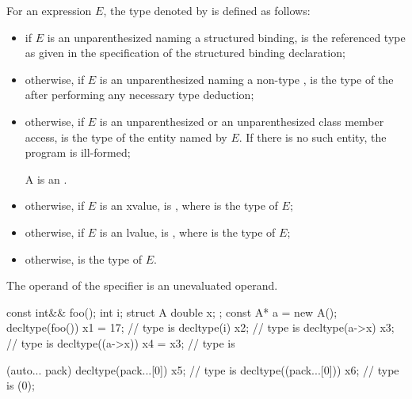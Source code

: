 \documentclass{wg21}
\begin{document}
\pnum
{}%
For an expression $E$, the type denoted by  is defined as follows:
\begin{itemize}
\item if $E$ is an unparenthesized 
naming a structured binding,
 is the referenced type as given in
the specification of the structured binding declaration;

\item otherwise, if $E$ is an unparenthesized 
naming a non-type ,
 is the type of the 
after performing any necessary
type deduction;

\item otherwise, if $E$ is an unparenthesized  or
an unparenthesized
class
member access,  is the
type of the entity named by $E$.
If there is no such entity, the program is ill-formed;

\begin{addedblock}
\begin{note}
A  is an .
\end{note}
\end{addedblock}

\item otherwise, if $E$ is
an xvalue,  is , where  is the type
of $E$;

\item otherwise, if $E$ is an lvalue, 
is , where  is the type of $E$;

\item otherwise,  is the type of $E$.
\end{itemize}

The operand of the  specifier is an unevaluated
operand.

\begin{example}
    \begin{codeblock}
        const int&& foo();
        int i;
        struct A { double x; };
        const A* a = new A();
        decltype(foo()) x1 = 17;        // type is 
        decltype(i) x2;                 // type is 
        decltype(a->x) x3;              // type is 
        decltype((a->x)) x4 = x3;       // type is 
        \end{codeblock}
        \begin{addedblock}
        \begin{codeblock}
        [](auto... pack){
            decltype(pack...[0])   x5;  // type is 
            decltype((pack...[0])) x6;  // type is 
        }(0);
        \end{codeblock}
        \end{addedblock}
\end{example}
\end{document}
